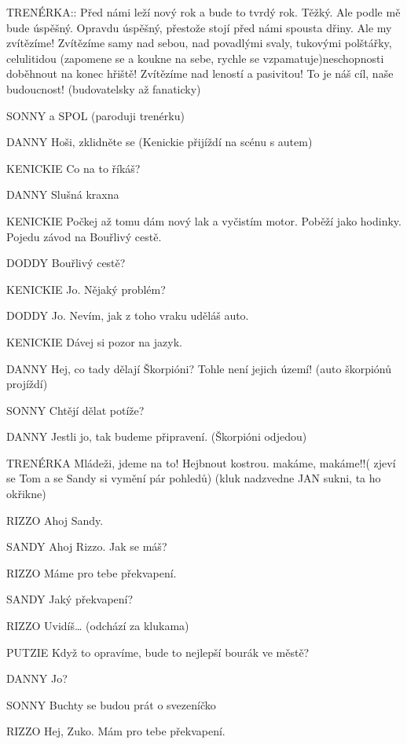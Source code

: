 TRENÉRKA::         Před námi leží nový rok a bude to tvrdý rok. Těžký. Ale podle mě bude         úspěšný. Opravdu úspěšný, přestože stojí před námi spousta dřiny.  Ale         my zvítězíme! Zvítězíme samy nad sebou, nad povadlými svaly,                 tukovými polštářky, celulitidou (zapomene se a koukne na sebe, rychle         se vzpamatuje)neschopnosti doběhnout na konec hřiště! Zvítězíme nad         leností a pasivitou!  To je náš cíl, naše budoucnost! (budovatelsky až         fanaticky)    

 SONNY a SPOL  (paroduji trenérku)

 DANNY        Hoši, zklidněte se  (Kenickie přijíždí na scénu s autem)

KENICKIE        Co na to říkáš?

DANNY        Slušná kraxna

KENICKIE        Počkej až tomu dám nový lak a vyčistím motor. Poběží jako hodinky.                     Pojedu závod na Bouřlivý cestě. 

DODDY        Bouřlivý cestě?

KENICKIE        Jo. Nějaký problém?

DODDY        Jo. Nevím, jak z toho vraku uděláš auto. 

KENICKIE        Dávej si pozor na jazyk.

DANNY        Hej, co tady dělají Škorpióni? Tohle není jejich území! (auto škorpiónů         projíždí)

SONNY          Chtějí dělat potíže?

DANNY         Jestli jo, tak budeme připravení. (Škorpióni odjedou)

TRENÉRKA        Mládeži, jdeme na to! Hejbnout kostrou. makáme, makáme!!( zjeví se Tom a se Sandy si vymění pár pohledů)  (kluk nadzvedne JAN sukni, ta ho okřikne)

RIZZO        Ahoj Sandy.

SANDY        Ahoj Rizzo. Jak se máš?

RIZZO        Máme pro tebe překvapení.

SANDY        Jaký překvapení?

RIZZO        Uvidíš…    (odchází za klukama)

PUTZIE        Když to opravíme, bude to nejlepší bourák ve městě?

DANNY        Jo?

SONNY        Buchty se budou prát o svezeníčko

RIZZO        Hej, Zuko. Mám pro tebe překvapení.

